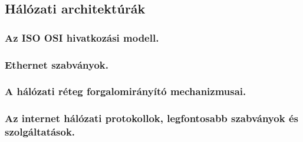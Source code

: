 \subsection{Hálózati architektúrák}
\subsubsection{Az ISO OSI hivatkozási modell.}

\subsubsection{Ethernet szabványok.}

\subsubsection{A hálózati réteg forgalomirányító mechanizmusai. }

\subsubsection{Az internet hálózati protokollok, legfontosabb szabványok és szolgáltatások.}
